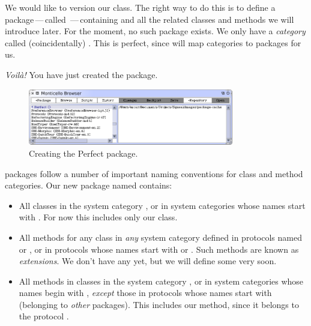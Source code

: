 \documentclass[a4paper,10pt,twoside]{book}
\begin{document}
We would like to version our  class. The right way to do this is to define a package\,---\,called \,---\,containing  and all the related classes and methods we will introduce later. For the moment, no such package exists. We only have a \emph{category} called (coincidentally) . This is perfect, since \MC will map categories to packages for us.


\emph{Voil\`a!} You have just created the  \MC package. 

\begin{figure}[ht]\centering
	\includegraphics[width=0.8\textwidth]{perfectPackage}
	\caption{Creating the Perfect package.}
\end{figure}

\MC packages follow a number of important naming conventions for class and method categories.
Our new package named  contains:

\begin{itemize}

\item All classes in the system category , or in system categories whose names start with . For now this includes only our  class.

\item All methods for any class in \emph{any} system category defined in protocols named  or , or in protocols whose names start with  or . Such methods are known as \emph{extensions}. We don't have any yet, but we will define some very soon.

\item All methods in classes in the system category , or in system categories whose names begin with , \emph{except} those in protocols whose names start with \prot{*} (\ie belonging to \emph{other} packages). This includes our  method, since it belongs to the protocol .

\end{itemize}
\end{document}
